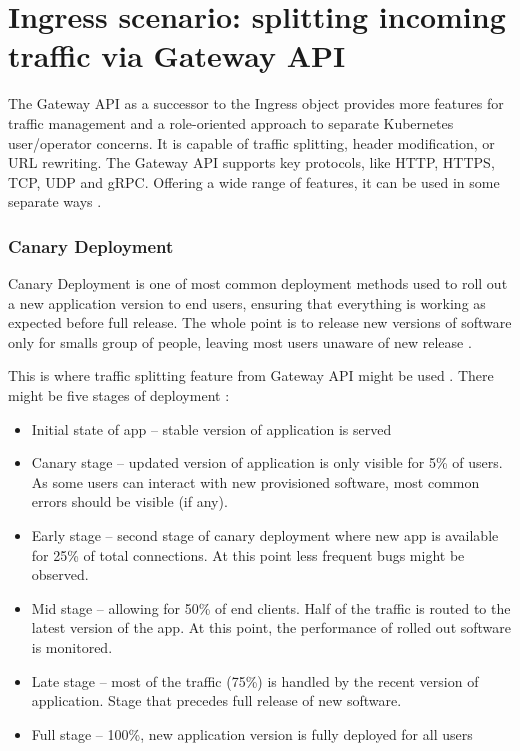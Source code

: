 \section{Ingress scenario: splitting incoming traffic via Gateway API}
\label{sec:ingress}

The Gateway API as a successor to the Ingress object provides more features for traffic management and a role-oriented approach to separate Kubernetes user/operator concerns. It is capable of traffic splitting, header modification, or URL rewriting. The Gateway API supports key protocols, like HTTP, HTTPS, TCP, UDP and gRPC. Offering a wide range of features, it can be used in some separate ways \cite{CiliumGatewayAPIBlog}.

\subsubsection{Canary Deployment}
\label{subsubsection:canary}

Canary Deployment is one of most common deployment methods used to roll out a new application version to end users, ensuring that everything is working as expected before full release. The whole point is to release new versions of software only for smalls group of people, leaving most users unaware of new release \cite{Canary}.

This is where traffic splitting feature from Gateway API might be used \cite{CiliumTrafficSplitting}. There might be five stages of deployment \cite{Canary}:

\begin{itemize}
    \item Initial state of app -- stable version of application is served
    \item Canary stage -- updated version of application is only visible for 5\% of users. As some users can interact with new provisioned software, most common errors should be visible (if any).
    \item Early stage -- second stage of canary deployment where new app is available for 25\% of total connections. At this point less frequent bugs might be observed.
    \item Mid stage -- allowing for 50\% of end clients. Half of the traffic is routed to the latest version of the app. At this point, the performance of rolled out software is monitored.
    \item Late stage -- most of the traffic (75\%) is handled by the recent version of application. Stage that precedes full release of new software.
    \item Full stage -- 100\%, new application version is fully deployed for all users
\end{itemize}


